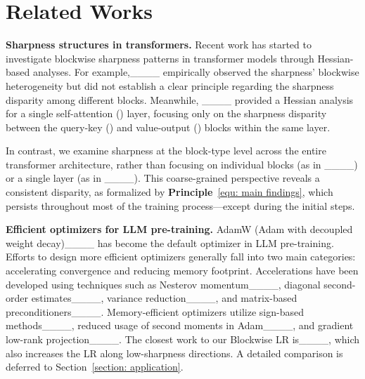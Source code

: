 \section{Related Works}
\label{section: related works}







{\bf Sharpness structures in transformers.} Recent work has started to investigate blockwise sharpness patterns in transformer models through Hessian-based analyses.
For example,____ empirically observed the sharpness' blockwise heterogeneity  but did not establish a clear principle regarding the sharpness disparity among different blocks. Meanwhile, ____ provided a Hessian analysis for a single self-attention (\SA) layer, focusing only on the  sharpness disparity between the query-key (\QK) and value-output (\VO) blocks within the same layer. 


In contrast, we examine sharpness at the block-type level across the entire transformer architecture, rather than focusing on individual blocks (as in ____) or a single layer (as in ____). This coarse-grained perspective reveals a consistent  disparity, as formalized by \textbf{Principle}~\eqref{equ: main findings},  which persists throughout most of the training process—except during the initial steps.


{\bf Efficient optimizers for LLM pre-training.} AdamW (Adam with decoupled weight decay)____ has become the default optimizer in LLM pre-training. 
Efforts to design more efficient optimizers generally fall into two main categories: accelerating convergence and reducing memory footprint.
Accelerations have been developed using techniques such as Nesterov momentum____, diagonal second-order estimates____, variance reduction____, and matrix-based preconditioners____. 
Memory-efficient optimizers utilize sign-based methods____, reduced usage of second moments in Adam____, and gradient low-rank projection____.
The closest work to our Blockwise LR is____, which also increases the LR along low-sharpness directions. A detailed comparison is deferred to Section~\ref{section: application}.

